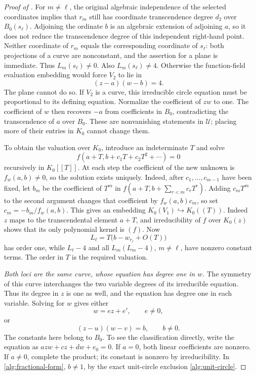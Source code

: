 \begin{proof}[Proof of ]
For \(m\ne\ell\), the original algebraic independence of the selected coordinates implies that
\(r_m\) still has coordinate transcendence degree \(d_2\) over \(B_0(s_\ell)\).
Adjoining the ordinate \(b\) is an algebraic extension of adjoining
\(a\), so it does not reduce the transcendence degree of this
independent right-hand point. Neither coordinate of \(r_m\) equals the
corresponding coordinate of \(s_\ell\): both projections of a curve
are nonconstant, and the assertion for a plane is immediate.
Thus \(L_m(s_\ell)\ne0\). Also
\(L_m(s_\ell)\ne4\). Otherwise the function-field evaluation embedding would force
\(V_2\) to lie in
\[
 (z-a)(w-b)=4.
\]
The plane cannot do so. If \(V_2\) is a curve, this irreducible
circle equation must be proportional to its defining equation.
Normalize the coefficient of \(zw\) to one. The coefficient of
\(w\) then recovers \(-a\) from coefficients in \(B_0\),
contradicting the transcendence of \(a\) over \(B_0\).
These are nonvanishing statements in \(\mathcal U\); placing more of their
entries in \(K_0\) cannot change them.

To obtain the valuation over \(K_0\), introduce an indeterminate
\(T\) and solve
\[
 f(a+T,b+c_1T+c_2T^2+\cdots)=0
\]
recursively in \(K_0[[T]]\). At each step the coefficient of the new
unknown is \(f_w(a,b)\ne0\), so the solution exists uniquely.
Indeed, after \(c_1,\ldots,c_{m-1}\) have been fixed, let \(b_m\)
be the coefficient of \(T^m\) in
\(f(a+T,b+\sum_{r<m}c_rT^r)\). Adding \(c_mT^m\) to the second
argument changes that coefficient by \(f_w(a,b)c_m\), so set
\(c_m=-b_m/f_w(a,b)\).
This gives an embedding \(K_0(V_1)\hookrightarrow K_0((T))\).
Indeed \(z\) maps to the transcendental element \(a+T\), and
irreducibility of \(f\) over \(K_0(z)\) shows that its only
polynomial kernel is \((f)\). Now
\[
 L_\ell=T\bigl(b-w_{r_\ell}+O(T)\bigr)
\]
has order one, while \(L_\ell-4\) and all
\(L_m(L_m-4)\), \(m\ne\ell\), have nonzero constant terms.
The order in \(T\) is the required valuation.

\emph{Both loci are the same curve, whose equation has degree one in \(w\).}
The symmetry of this curve interchanges the two variable degrees of
its irreducible equation. Thus its degree in \(z\) is one as well, and the
equation has degree one in each variable. Solving for \(w\) gives either
\begin{equation}\label{alg:line-form}
 w=ez+e',\qquad e\ne0,
\end{equation}
or
\begin{equation}\label{alg:fractional-form}
 (z-u)(w-v)=b,\qquad b\ne0.
\end{equation}
The constants here belong to \(B_0\). To see the classification
directly, write the equation as \(azw+cz+dw+e_0=0\). If \(a=0\),
both linear coefficients are nonzero. If \(a\ne0\), complete the
product; its constant is nonzero by irreducibility. In
\eqref{alg:fractional-form}, \(b\ne1\), by the exact unit-circle
exclusion \eqref{alg:unit-circle}.


\end{proof}
